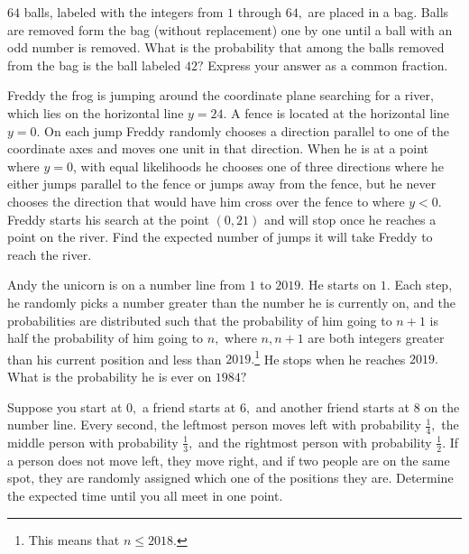 \documentclass[mast]{lucky}
\begin{document}
\begin{req}{6}
$64$ balls, labeled with the integers from $1$ through $64,$ are placed in a bag. Balls are removed form the bag (without replacement) one by one until a ball with an odd number is removed. What is the probability that among the balls removed from the bag is the ball labeled $42?$ Express your answer as a common fraction.
\end{req}

\begin{prob}[AIME I 2016/13]{6}
Freddy the frog is jumping around the coordinate plane searching for a river, which lies on the horizontal line $y = 24$. A fence is located at the horizontal line $y = 0$. On each jump Freddy randomly chooses a direction parallel to one of the coordinate axes and moves one unit in that direction. When he is at a point where $y=0$, with equal likelihoods he chooses one of three directions where he either jumps parallel to the fence or jumps away from the fence, but he never chooses the direction that would have him cross over the fence to where $y < 0$. Freddy starts his search at the point $(0, 21)$ and will stop once he reaches a point on the river. Find the expected number of jumps it will take Freddy to reach the river.
\end{prob}


\begin{prob}{9}
Andy the unicorn is on a number line from $1$ to $2019.$ He starts on $1.$ Each step, he randomly picks a number greater than the number he is currently on, and the probabilities are distributed such that the probability of him going to $n+1$ is half the probability of him going to $n,$ where $n,n+1$ are both integers greater than his current position and less than $2019.$\footnote{This means that $n\leq 2018.$} He stops when he reaches $2019.$ What is the probability he is ever on $1984?$
\end{prob}

\begin{prob}{13}
 Suppose you start at $0,$ a friend starts at $6,$ and another friend starts at $8$ on the number line. Every second, the leftmost person moves left with probability $\frac{1}{4},$ the middle person with probability $\frac{1}{3},$ and the rightmost person with probability $\frac{1}{2}.$ If a person does not move left, they move right, and if two people are on the same spot, they are randomly assigned which one of the positions they are. Determine the expected time until you all meet in one point.
\end{prob}
\end{document}
